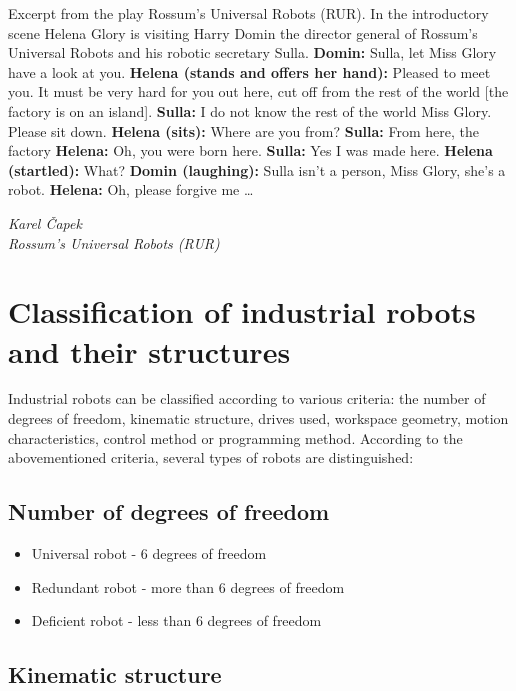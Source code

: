 \epigraph{

Excerpt from the play Rossum’s Universal Robots (RUR).\break
In the introductory scene Helena Glory is visiting Harry Domin the director general of Rossum’s Universal Robots and his robotic secretary Sulla.\break
\break
\textbf{Domin:} Sulla, let Miss Glory have a look at you.\break
\textbf{Helena (stands and offers her hand):} Pleased to meet you. It must be very hard for you out here, cut off from the rest of the world [the factory is on an island].\break
\textbf{Sulla:} I do not know the rest of the world Miss Glory. Please sit down.\break
\textbf{Helena (sits):} Where are you from?\break
\textbf{Sulla:} From here, the factory\break
\textbf{Helena:} Oh, you were born here.\break
\textbf{Sulla:} Yes I was made here.\break
\textbf{Helena (startled):} What?\break
\textbf{Domin (laughing):} Sulla isn’t a person, Miss Glory, she’s a robot.\break
\textbf{Helena:} Oh, please forgive me …


}{\textit{Karel Čapek \\ Rossum’s Universal Robots (RUR)}}
\section{Classification of industrial robots and their structures}

Industrial robots can be classified according to various criteria: the number of degrees of freedom, kinematic structure, drives used, workspace geometry, motion characteristics, control method or programming method. According to the abovementioned criteria, several types of robots are distinguished:

\subsection*{Number of degrees of freedom}

\begin{itemize}
    \item Universal robot - 6 degrees of freedom
    \item Redundant robot - more than 6 degrees of freedom
    \item Deficient robot - less than 6 degrees of freedom
\end{itemize}

\subsection*{Kinematic structure}

